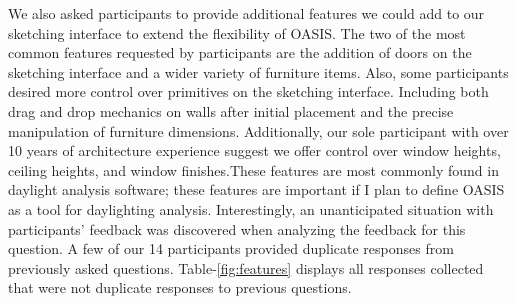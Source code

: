 We also asked participants to provide additional features we could add to our sketching interface to extend the flexibility of OASIS.  The two of the most common features requested by participants are the addition of doors on the sketching interface and a wider variety of furniture items.  Also, some participants desired more control over primitives on the sketching interface.  Including both drag and drop mechanics on walls after initial placement and the precise manipulation of furniture dimensions.  Additionally, our sole participant with over 10 years of architecture experience suggest we offer control over window heights, ceiling heights, and window finishes.These features are most commonly found in daylight analysis software; these features are  important if I plan to define OASIS as a tool for daylighting analysis.  Interestingly, an unanticipated situation with participants' feedback was discovered when analyzing the feedback for this question.  A few of our 14 participants provided duplicate responses from previously asked questions.  Table-\ref{fig:features} displays all responses collected that were not duplicate responses to previous questions.  \\


